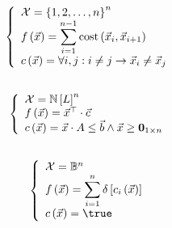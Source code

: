 \begin{equation}
\left\{\begin{array}{ll}
\mathcal{X}=\left\{ 1,2,\ldots,n\right\}^n\\
f\left(\vec{x}\right)=\displaystyle\sum_{i=1}^{n-1}\mbox{cost}\left(\vec{x}_i,\vec{x}_{i+1}\right)\\
c\left(\vec{x}\right)=\forall i,j: i\neq j\rightarrow \vec{x}_i\neq\vec{x}_j
\end{array}\right.
\end{equation}

\subsection{}

\begin{equation}
\guards{
\ConfigSet=\NatSet[\bitvar]^n\\
\fun{\evalfun}{\vec{x}}=\transpose{\vec{x}}\cdot\vec{c}\\
\fun{\hcfun}{\vec{x}}=\vec{x}\cdot A\leq\vec{b}\wedge\vec{x}\geq\zeromatrix[1\times n]
}
\end{equation}

\subsection{}

\begin{equation}
\guards{
\ConfigSet=\BoolSet^n\\
\fun{\evalfun}{\vec{x}}=\displaystyle\sum_{i=1}^{n}\krdelta{\fun{c_i}{\vec{x}}}\\
\fun{\hcfun}{\vec{x}}=\true
}
\end{equation}

\subsection{}

\subsection{}

\subsection{}

\subsection{}